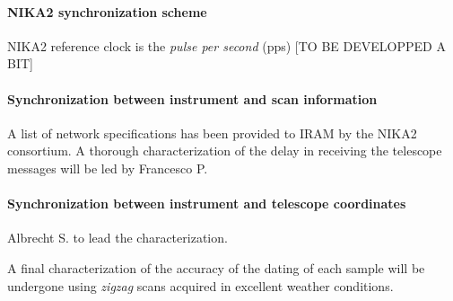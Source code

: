 \paragraph{NIKA2 synchronization scheme}
NIKA2 reference clock is the \emph{pulse per second}
(pps)  {\color{magenta} [TO BE DEVELOPPED A BIT]}

\paragraph{Synchronization between instrument and scan information}
A list of network specifications has been provided to IRAM by the NIKA2 consortium. A thorough characterization of the delay in receiving the telescope messages will be led by Francesco P.

\paragraph{Synchronization between instrument and telescope coordinates}
Albrecht S. to lead the characterization.

A final characterization of the accuracy of the dating of each sample will be undergone using \emph{zigzag} scans acquired in excellent weather conditions. 


